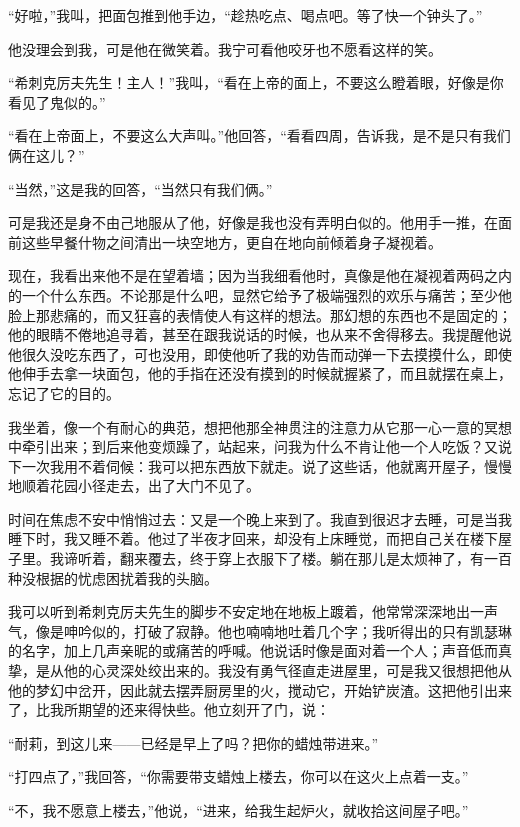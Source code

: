 \par “好啦，”我叫，把面包推到他手边，“趁热吃点、喝点吧。等了快一个钟头了。”
\par 他没理会到我，可是他在微笑着。我宁可看他咬牙也不愿看这样的笑。
\par “希刺克厉夫先生！主人！”我叫，“看在上帝的面上，不要这么瞪着眼，好像是你看见了鬼似的。”
\par “看在上帝面上，不要这么大声叫。”他回答，“看看四周，告诉我，是不是只有我们俩在这儿？”
\par “当然，”这是我的回答，“当然只有我们俩。”
\par 可是我还是身不由己地服从了他，好像是我也没有弄明白似的。他用手一推，在面前这些早餐什物之间清出一块空地方，更自在地向前倾着身子凝视着。
\par 现在，我看出来他不是在望着墙；因为当我细看他时，真像是他在凝视着两码之内的一个什么东西。不论那是什么吧，显然它给予了极端强烈的欢乐与痛苦；至少他脸上那悲痛的，而又狂喜的表情使人有这样的想法。那幻想的东西也不是固定的；他的眼睛不倦地追寻着，甚至在跟我说话的时候，也从来不舍得移去。我提醒他说他很久没吃东西了，可也没用，即使他听了我的劝告而动弹一下去摸摸什么，即使他伸手去拿一块面包，他的手指在还没有摸到的时候就握紧了，而且就摆在桌上，忘记了它的目的。
\par 我坐着，像一个有耐心的典范，想把他那全神贯注的注意力从它那一心一意的冥想中牵引出来；到后来他变烦躁了，站起来，问我为什么不肯让他一个人吃饭？又说下一次我用不着伺候：我可以把东西放下就走。说了这些话，他就离开屋子，慢慢地顺着花园小径走去，出了大门不见了。
\par 时间在焦虑不安中悄悄过去：又是一个晚上来到了。我直到很迟才去睡，可是当我睡下时，我又睡不着。他过了半夜才回来，却没有上床睡觉，而把自己关在楼下屋子里。我谛听着，翻来覆去，终于穿上衣服下了楼。躺在那儿是太烦神了，有一百种没根据的忧虑困扰着我的头脑。
\par 我可以听到希刺克厉夫先生的脚步不安定地在地板上踱着，他常常深深地出一声气，像是呻吟似的，打破了寂静。他也喃喃地吐着几个字；我听得出的只有凯瑟琳的名字，加上几声亲昵的或痛苦的呼喊。他说话时像是面对着一个人；声音低而真挚，是从他的心灵深处绞出来的。我没有勇气径直走进屋里，可是我又很想把他从他的梦幻中岔开，因此就去摆弄厨房里的火，搅动它，开始铲炭渣。这把他引出来了，比我所期望的还来得快些。他立刻开了门，说：
\par “耐莉，到这儿来——已经是早上了吗？把你的蜡烛带进来。”
\par “打四点了，”我回答，“你需要带支蜡烛上楼去，你可以在这火上点着一支。”
\par “不，我不愿意上楼去，”他说，“进来，给我生起炉火，就收拾这间屋子吧。”
